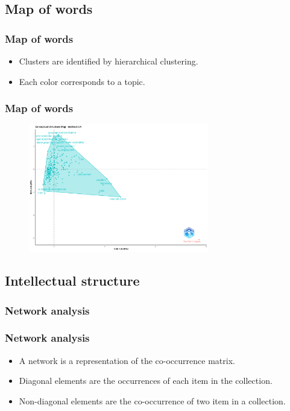 \documentclass[aspectratio=169]{beamer}
\begin{document}
\subsection{Map of words}


\begin{frame}
	\frametitle{Map of words}
	\begin{itemize}
		\item Clusters are identified by hierarchical clustering.
		\item Each color corresponds to a topic.
	\end{itemize}
\end{frame}

\begin{frame}
	\frametitle{Map of words}
	\begin{figure}
		\centering
		\includegraphics[width=0.7\textwidth]{figures/con_stru_map.png}
	\end{figure}
\end{frame}


\subsection{Intellectual structure}


\subsubsection{Network analysis}

\begin{frame}
	\frametitle{Network analysis}
	\begin{itemize}
		\item A network is a representation of the co-occurrence matrix.
		\item Diagonal elements are the occurrences of each item in the collection.
		\item Non-diagonal elements are the co-occurrence of two item in a
		      collection.
	\end{itemize}
\end{frame}
\end{document}
